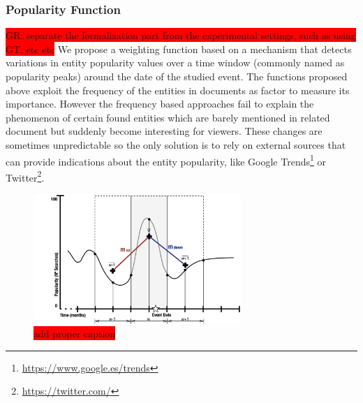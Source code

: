 \documentclass{llncs}
\newcommand{\todo}[1]{\colorbox{red}{#1}}
\begin{document}
\subsubsection{Popularity Function}

\todo{GR: separate the formalization part from the experimental settings, such as using GT, etc etc}
We propose a weighting function based on a mechanism that detects variations in entity popularity values over a time window (commonly named as popularity peaks) around the date of the studied event. The functions proposed above exploit the frequency of the entities in documents as factor to measure its importance. However the frequency based approaches fail to explain the phenomenon of certain found entities which are barely mentioned in related document but suddenly become interesting for viewers. These changes are sometimes unpredictable so the only solution is to rely on external sources that can provide indications about the entity popularity, like Google Trends\footnote{\url{https://www.google.es/trends}} or Twitter\footnote{\url{https://twitter.com/}}. 

\begin{figure}[h!]
\centering
\includegraphics[width=0.7\textwidth]{figure/PopularityMeasure}
\caption{\todo{add proper caption}}
\label{fig:PopularityMeasure}%
\end{figure}
\end{document}
